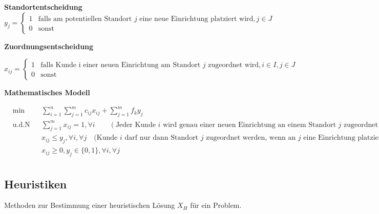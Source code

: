       \par \textbf{Standortentscheidung}
      $$
        y_j = 
        \begin{cases}
          1 & \text{falls am potentiellen Standort } j \text{ eine neue Einrichtung platziert wird}, j \in J\\
          0 & \text{sonst}
        \end{cases} 
      $$

      \par \textbf{Zuordnungsentscheidung}
    
      $$
        x_{ij} = 
        \begin{cases}
          1 & \text{falls Kunde i einer neuen Einrichtung am Standort } j \text{ zugeordnet wird}, i \in I, j \in J\\
          0 & \text{sonst}
        \end{cases} 
      $$

      \par \textbf{Mathematisches Modell}

      \begin{equation}
        \begin{aligned}
          & \underset{}{\text{min}}
          && \sum_{i=1}^{n}\sum_{j=1}^{m}c_{ij}x_{ij} + \sum_{j=1}^{m}f_ky_{j}\\
          & \text{u.d.N}
          & & \sum_{j=1}^{m}x_{ij}=1, \forall i \qquad  (\text{Jeder Kunde } i \text{ wird genau einer neuen Einrichtung an einem Standort } j \text{ zugeordnet})\\ 
          & & & x_{ij} \leq y_j, \forall i, \forall j \quad \text{(Kunde } i \text{ darf nur dann Standort } j \text{ zugeordnet werden, wenn an } j \text{ eine Einrichtung platziert)}\\ 
          & & & x_{ij} \geq 0, y_j \in \{0,1\}, \forall i, \forall j \\
        \end{aligned}
      \end{equation}


    \subsection{Heuristiken} %
    \label{sub:heuristiken}

      Methoden zur Bestimmung einer heuristischen Lösung $X_H$ für ein Problem.

